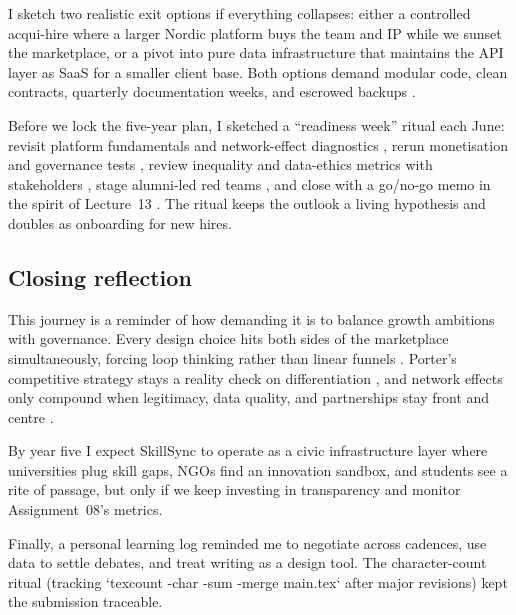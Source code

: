 I sketch two realistic exit options if everything collapses: either a controlled acqui-hire where a larger Nordic platform buys the team and IP while we sunset the marketplace, or a pivot into pure data infrastructure that maintains the API layer as SaaS for a smaller client base. Both options demand modular code, clean contracts, quarterly documentation weeks, and escrowed backups \citep{Reillier2017}.

Before we lock the five-year plan, I sketched a ``readiness week'' ritual each June: revisit platform fundamentals and network-effect diagnostics \citep{Lecture01,Lecture02}, rerun monetisation and governance tests \citep{Lecture05,Lecture10}, review inequality and data-ethics metrics with stakeholders \citep{Lecture08,Lecture11}, stage alumni-led red teams \citep{Lecture12}, and close with a go/no-go memo in the spirit of Lecture~13 \citep{Lecture13}. The ritual keeps the outlook a living hypothesis and doubles as onboarding for new hires.

\subsection*{Closing reflection}
This journey is a reminder of how demanding it is to balance growth ambitions with governance. Every design choice hits both sides of the marketplace simultaneously, forcing loop thinking rather than linear funnels \citep{Choudary2016}. Porter’s competitive strategy stays a reality check on differentiation \citep{Porter2008}, and network effects only compound when legitimacy, data quality, and partnerships stay front and centre \citep{Srnicek2017}.

By year five I expect SkillSync to operate as a civic infrastructure layer where universities plug skill gaps, NGOs find an innovation sandbox, and students see a rite of passage, but only if we keep investing in transparency and monitor Assignment~08's metrics.

Finally, a personal learning log reminded me to negotiate across cadences, use data to settle debates, and treat writing as a design tool. The character-count ritual (tracking `texcount -char -sum -merge main.tex` after major revisions) kept the submission traceable.
